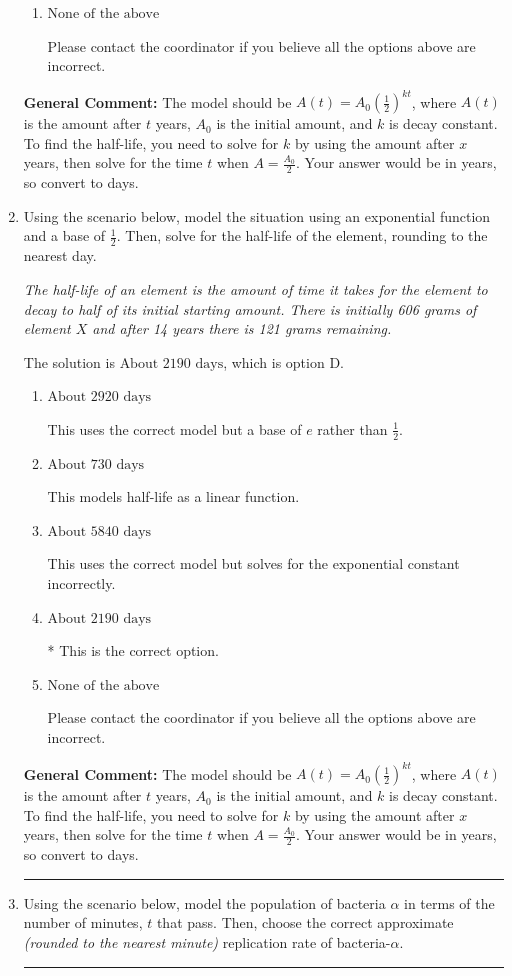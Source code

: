 \documentclass{extbook}[14pt]
\newcommand{\litem}[1]{\item #1

\rule{\textwidth}{0.4pt}}
\begin{document}
\begin{enumerate}
{\begin{enumerate}[label=\Alph*.]
This models half-life as a linear function.
\item \( \text{None of the above} \)

Please contact the coordinator if you believe all the options above are incorrect.
\end{enumerate}

\textbf{General Comment:} The model should be $A(t) = A_0 (\frac{1}{2})^{kt}$, where $A(t)$ is the amount after $t$ years, $A_0$ is the initial amount, and $k$ is decay constant. To find the half-life, you need to solve for $k$ by using the amount after $x$ years, then solve for the time $t$ when $A = \frac{A_0}{2}$. Your answer would be in years, so convert to days.
}
\litem{
Using the scenario below, model the situation using an exponential function and a base of $\frac{1}{2}$. Then, solve for the half-life of the element, rounding to the nearest day.

\begin{center}
    \textit{ The half-life of an element is the amount of time it takes for the element to decay to half of its initial starting amount. There is initially 606 grams of element $X$ and after 14 years there is 121 grams remaining. }
\end{center}


The solution is \( \text{About } 2190 \text{ days} \), which is option D.\begin{enumerate}[label=\Alph*.]
\item \( \text{About } 2920 \text{ days} \)

This uses the correct model but a base of $e$ rather than $\frac{1}{2}$.
\item \( \text{About } 730 \text{ days} \)

This models half-life as a linear function.
\item \( \text{About } 5840 \text{ days} \)

This uses the correct model but solves for the exponential constant incorrectly.
\item \( \text{About } 2190 \text{ days} \)

* This is the correct option.
\item \( \text{None of the above} \)

Please contact the coordinator if you believe all the options above are incorrect.
\end{enumerate}

\textbf{General Comment:} The model should be $A(t) = A_0 (\frac{1}{2})^{kt}$, where $A(t)$ is the amount after $t$ years, $A_0$ is the initial amount, and $k$ is decay constant. To find the half-life, you need to solve for $k$ by using the amount after $x$ years, then solve for the time $t$ when $A = \frac{A_0}{2}$. Your answer would be in years, so convert to days.
}
\litem{
Using the scenario below, model the population of bacteria $\alpha$ in terms of the number of minutes, $t$ that pass. Then, choose the correct approximate \textit{(rounded to the nearest minute)} replication rate of bacteria-$\alpha$.

}
\end{enumerate}
\end{document}
